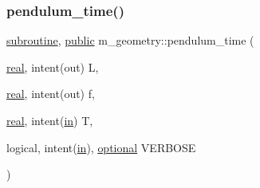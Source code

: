 \mbox{\label{namespacem__geometry_aa15fe1bd2e07252679a3516d936b290f}} 
\subsubsection{\texorpdfstring{pendulum\+\_\+time()}{pendulum\_time()}}
{\footnotesize\ttfamily \hyperlink{M__stopwatch_83_8txt_acfbcff50169d691ff02d4a123ed70482}{subroutine}, \hyperlink{M__stopwatch_83_8txt_a2f74811300c361e53b430611a7d1769f}{public} m\+\_\+geometry\+::pendulum\+\_\+time (\begin{DoxyParamCaption}\item[{\hyperlink{read__watch_83_8txt_abdb62bde002f38ef75f810d3a905a823}{real}, intent(out)}]{L,  }\item[{\hyperlink{read__watch_83_8txt_abdb62bde002f38ef75f810d3a905a823}{real}, intent(out)}]{f,  }\item[{\hyperlink{read__watch_83_8txt_abdb62bde002f38ef75f810d3a905a823}{real}, intent(\hyperlink{M__journal_83_8txt_afce72651d1eed785a2132bee863b2f38}{in})}]{T,  }\item[{logical, intent(\hyperlink{M__journal_83_8txt_afce72651d1eed785a2132bee863b2f38}{in}), \hyperlink{option__stopwatch_83_8txt_aa4ece75e7acf58a4843f70fe18c3ade5}{optional}}]{V\+E\+R\+B\+O\+SE }\end{DoxyParamCaption})}

